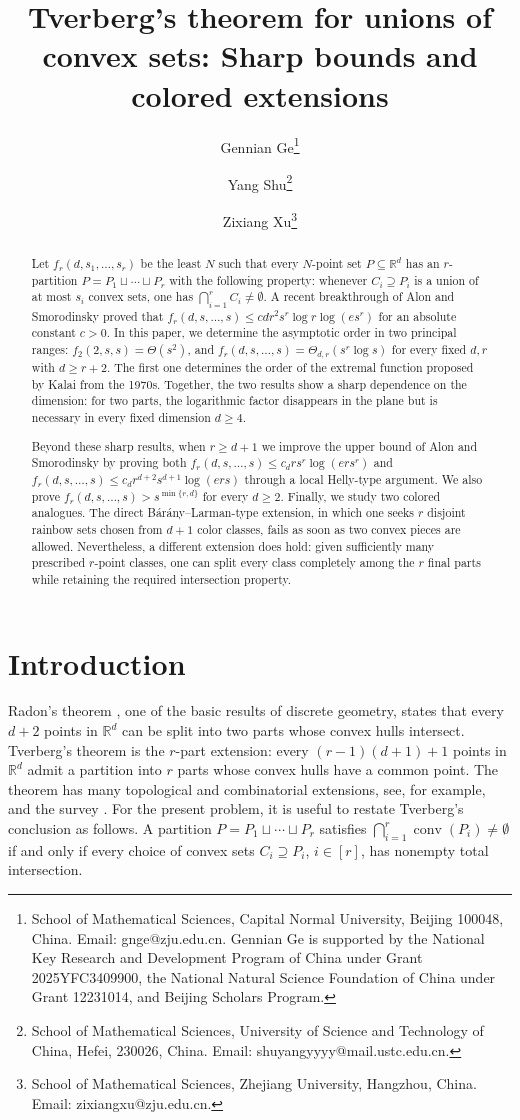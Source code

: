 \documentclass[11pt]{article}
\title{Tverberg's theorem for unions of convex sets: Sharp bounds and colored extensions}
\author{
Gennian Ge\thanks{School of Mathematical Sciences, Capital Normal University, Beijing 100048, China. Email: gnge@zju.edu.cn. Gennian Ge is supported by the National Key Research and Development Program of China under Grant 2025YFC3409900, the National Natural Science Foundation of China under Grant 12231014, and Beijing Scholars Program.}
\and 
Yang Shu\thanks{School of Mathematical Sciences, University of Science and Technology of China, Hefei, 230026, China. Email: shuyangyyyy@mail.ustc.edu.cn.}
\and
Zixiang Xu\thanks{School of Mathematical Sciences, Zhejiang University, Hangzhou, China. Email: zixiangxu@zju.edu.cn.}
}
\date{}
\theoremstyle{definition}
\newcommand{\R}{\mathbb{R}}
\begin{document}
\maketitle
\begin{abstract}
Let $f_{r}(d,s_{1},\ldots,s_{r})$ be the least $N$ such that every $N$-point set $P\subseteq\R^{d}$ has an $r$-partition $P=P_{1}\sqcup\cdots\sqcup P_{r}$ with the following property: whenever $C_{i}\supseteq P_{i}$ is a union of at most $s_{i}$ convex sets, one has $\bigcap_{i=1}^{r}C_{i}\ne\emptyset$. A recent breakthrough of Alon and Smorodinsky proved that $f_{r}(d,s,\ldots,s)\le cdr^{2}s^{r}\log r\log(es^{r})$ for an absolute constant $c>0$. In this paper, we determine the asymptotic order in two principal ranges: $f_{2}(2,s,s)=\Theta(s^{2})$, and $f_{r}(d,s,\ldots,s)=\Theta_{d,r}(s^{r}\log{s})$ for every fixed $d,r$ with $d\ge r+2$. The first one determines the order of the extremal function proposed by Kalai from the 1970s. Together, the two results show a sharp dependence on the dimension: for two parts, the logarithmic factor disappears in the plane but is necessary in every fixed dimension $d\ge4$.

Beyond these sharp results, when $r\ge d+1$ we improve the upper bound of Alon and Smorodinsky by proving both $f_{r}(d,s,\ldots,s)\le c_{d}rs^{r}\log(ers^{r})$ and $f_{r}(d,s,\ldots,s)\le c_{d}r^{d+2}s^{d+1}\log(ers)$ through a local Helly-type argument. We also prove $f_{r}(d,s,\ldots,s)>s^{\min\{r,d\}}$ for every $d\ge2$. Finally, we study two colored analogues. The direct B\'{a}r\'{a}ny--Larman-type extension, in which one seeks $r$ disjoint rainbow sets chosen from $d+1$ color classes, fails as soon as two convex pieces are allowed. Nevertheless, a different extension does hold: given sufficiently many prescribed $r$-point classes, one can split every class completely among the $r$ final parts while retaining the required intersection property.
\end{abstract}

\section{Introduction}
Radon's theorem \cite{Radon1921}, one of the basic results of discrete geometry, states that every \(d+2\) points in \(\R^{d}\) can be split into two parts whose convex hulls intersect. Tverberg's theorem \cite{Tverberg1966} is the \(r\)-part extension: every \((r-1)(d+1)+1\) points in \(\R^{d}\) admit a partition into \(r\) parts whose convex hulls have a common point. The theorem has many topological and combinatorial extensions, see, for example, \cite{BjornerLovaszVrecicaZivaljevic1994,BlagojevicMatschkeZiegler2015,Matousek1996,MatousekTancerWagner2012,ZivaljevicVrecica1992} and the survey \cite{BaranySoberon2018}. For the present problem, it is useful to restate Tverberg's conclusion as follows. A partition \(P=P_{1}\sqcup\cdots\sqcup P_{r}\) satisfies \(\bigcap_{i=1}^{r}\operatorname{conv}(P_{i})\ne\emptyset\) if and only if every choice of convex sets \(C_{i}\supseteq P_{i}\), \(i\in [r]\), has nonempty total intersection.
\end{document}
